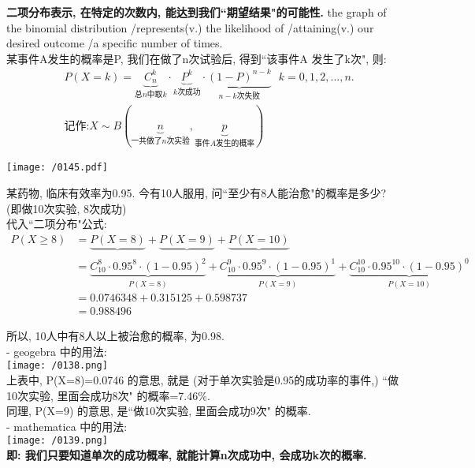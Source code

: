 \documentclass[UTF8]{ctexart}
\begin{document}
	\textbf{二项分布表示, 在特定的次数内, 能达到我们``期望结果"的可能性.} the graph of the binomial distribution /represents(v.) the likelihood of /attaining(v.) our desired outcome /a specific number of times. \\


某事件A发生的概率是P, 我们在做了n次试验后, 得到``该事件A 发生了k次", 则: 
\begin{align*}  %
	&P\left( X=k \right) =\underset{\text{总}n\text{中取}k}{\underbrace{C_{n}^{k}}}\cdot \underset{k\text{次成功}}{\underbrace{P^k}}\cdot \underset{n-k\text{次失败}}{\underbrace{\left( 1-P \right) ^{n-k}}}\ \ \ k=0,1,2,...,n.\\
&\text{记作:}X \sim B\left( \underset{\text{一共做了}n\text{次实验}}{\underbrace{n}},\underset{\text{事件}A\text{发生的概率}}{\underbrace{p}} \right)
\end{align*}
\vspace{1em} 

\texttt{[image: /0145.pdf]} \\



\begin{myEnvSample}
某药物, 临床有效率为0.95. 今有10人服用, 问``至少有8人能治愈"的概率是多少? (即做10次实验, 8次成功) \\
代入``二项分布"公式:
\begin{align*}  %
	P\left( X\ge 8 \right) 
&=\underset{}{\underbrace{P\left( X=8 \right) }}+\underset{}{\underbrace{P\left( X=9 \right) }}+\underset{}{\underbrace{P\left( X=10 \right) }}\\
&=\underset{P\left( X=8 \right)}{\underbrace{C_{10}^{8}\cdot 0.95^8\cdot \left( 1-0.95 \right) ^2}}+\underset{P\left( X=9 \right)}{\underbrace{C_{10}^{9}\cdot 0.95^9\cdot \left( 1-0.95 \right) ^1}}+\underset{P\left( X=10 \right)}{\underbrace{C_{10}^{10}\cdot 0.95^{10}\cdot \left( 1-0.95 \right) ^0}}\\
&=0.0746348+0.315125+0.598737 \\
&=0.988496
\end{align*}

所以, 10人中有8人以上被治愈的概率, 为0.98. \\

- geogebra 中的用法: \\
\texttt{[image: /0138.png]} \\

上表中, P(X=8)=0.0746 的意思, 就是 (对于单次实验是0.95的成功率的事件,) ``做10次实验, 里面会成功8次" 的概率=7.46\%. \\
同理, P(X=9) 的意思, 是``做10次实验, 里面会成功9次" 的概率. \\

- mathematica 中的用法: \\
\texttt{[image: /0139.png]} \\

\textbf{即: 我们只要知道单次的成功概率, 就能计算n次成功中, 会成功k次的概率. }
\end{myEnvSample}
\vspace{1em} 
\end{document}
